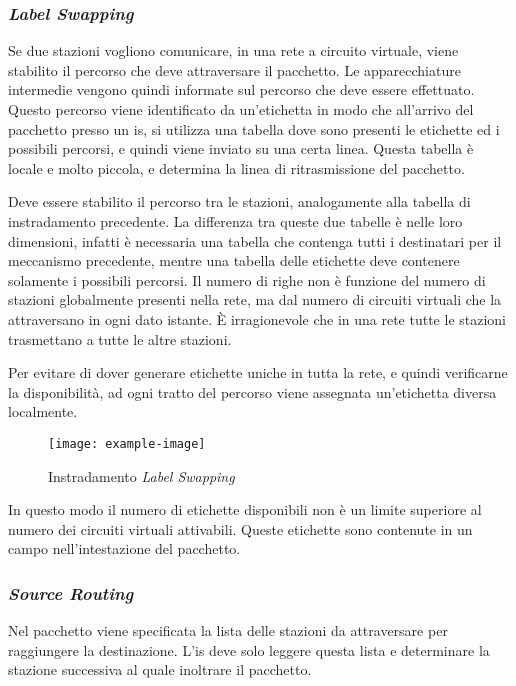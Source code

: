 \documentclass{article}
\numberwithin{equation}{subsection}
\begin{document}
\subsubsection{\textit{Label Swapping}}

Se due stazioni vogliono comunicare, in una rete a circuito virtuale, viene stabilito il percorso che deve attraversare il pacchetto. Le apparecchiature intermedie 
vengono quindi informate sul percorso che deve essere effettuato. Questo percorso viene identificato da un'etichetta in modo che all'arrivo del pacchetto presso un \textcolor{Emerald}{is}, 
si utilizza una tabella dove sono presenti le etichette ed i possibili percorsi, e quindi viene inviato su una certa linea. Questa tabella è locale e molto piccola, e 
determina la linea di ritrasmissione del pacchetto. 

Deve essere stabilito il percorso tra le stazioni, analogamente alla tabella di instradamento precedente. La differenza tra queste due tabelle 
è nelle loro dimensioni, infatti è necessaria una tabella che contenga tutti i destinatari per il meccanismo precedente, mentre una tabella 
delle etichette deve contenere solamente i possibili percorsi. Il numero di righe non è funzione del numero di stazioni globalmente presenti nella rete, ma dal numero 
di circuiti virtuali che la attraversano in ogni dato istante. \`{E} irragionevole che in una rete tutte le stazioni trasmettano a tutte le altre stazioni. 

Per evitare di dover generare etichette uniche in tutta la rete, e quindi verificarne la disponibilità, ad ogni tratto del percorso viene assegnata un'etichetta 
diversa localmente. 

\begin{figure}[H]%
    \centering%
    \texttt{[image: example-image]}%
    \caption{Instradamento \textit{Label Swapping}}%
\end{figure}

In questo modo il numero di etichette disponibili non è un limite superiore al numero dei circuiti virtuali attivabili. Queste etichette sono contenute in un campo 
nell'intestazione del pacchetto. 

\subsubsection{\textit{Source Routing}}

Nel pacchetto viene specificata la lista delle stazioni da attraversare per raggiungere la destinazione. L'\textcolor{Emerald}{is} deve solo leggere questa lista e determinare 
la stazione successiva al quale inoltrare il pacchetto. 
\end{document}
